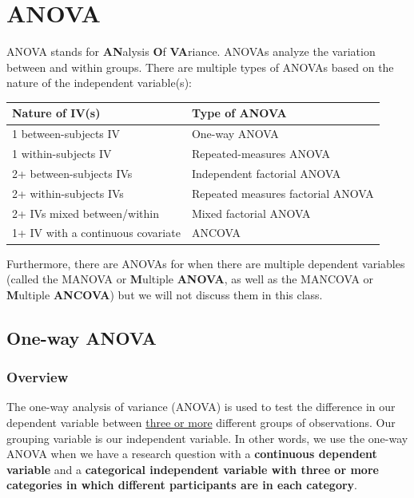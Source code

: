 \documentclass[
]{book}
\begin{document}
\hypertarget{anova}{%
\chapter{ANOVA}\label{anova}}

ANOVA stands for \textbf{AN}alysis \textbf{O}f \textbf{VA}riance. ANOVAs analyze the variation between and within groups. There are multiple types of ANOVAs based on the nature of the independent variable(s):

\begin{longtable}[]{@{}ll@{}}
\toprule
\textbf{Nature of IV(s)} & \textbf{Type of ANOVA} \\
\midrule
\endhead
1 between-subjects IV & One-way ANOVA \\
1 within-subjects IV & Repeated-measures ANOVA \\
2+ between-subjects IVs & Independent factorial ANOVA \\
2+ within-subjects IVs & Repeated measures factorial ANOVA \\
2+ IVs mixed between/within & Mixed factorial ANOVA \\
1+ IV with a continuous covariate & ANCOVA \\
\bottomrule
\end{longtable}

Furthermore, there are ANOVAs for when there are multiple dependent variables (called the MANOVA or \textbf{M}ultiple \textbf{ANOVA}, as well as the MANCOVA or \textbf{M}ultiple \textbf{ANCOVA}) but we will not discuss them in this class.

\hypertarget{one-way-anova}{%
\section{One-way ANOVA}\label{one-way-anova}}

\hypertarget{overview-6}{%
\subsection{Overview}\label{overview-6}}

The one-way analysis of variance (ANOVA) is used to test the difference in our dependent variable between \underline{three or more} different groups of observations. Our grouping variable is our independent variable. In other words, we use the one-way ANOVA when we have a research question with a \textbf{continuous dependent variable} and a \textbf{categorical independent variable with three or more categories in which different participants are in each category}.
\end{document}
